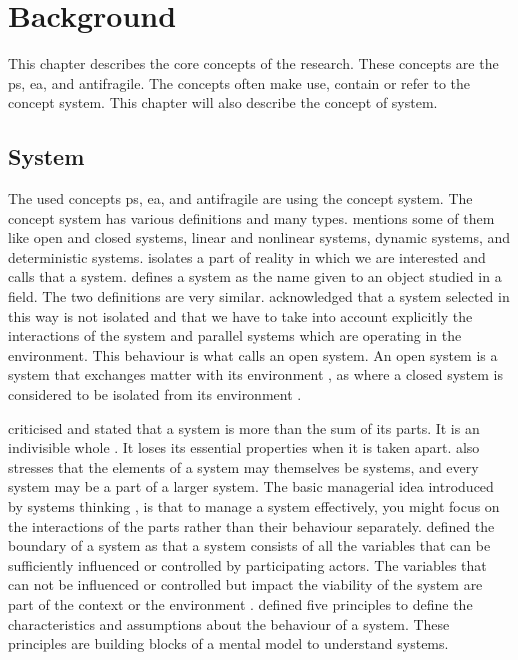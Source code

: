 \chapter{Background}
\label{ch:theoreticalbackground}
This chapter describes the core concepts of the research. These concepts are the \gls{ps}, \acrlong{ea}, and \gls{antifragile}. The concepts often make use, contain or refer to the concept system. This chapter will also describe the concept of system.

\section{System}
\label{sec:tbsystem}
The used concepts \gls{ps}, \acrshort{ea}, and \gls{antifragile} are using the concept system. The concept system has various definitions and many types. \textcite{Rickles2007} mentions some of them like open and closed systems, linear and nonlinear systems, dynamic systems, and deterministic systems. \textcite[p.~13]{Mannaert2016} isolates a part of reality in which we are interested and calls that a system. \textcite[p.~933]{Rickles2007} defines a system as the name given to an object studied in a field. The two definitions are very similar. \textcite[p.~13--14]{Mannaert2016} acknowledged that a system selected in this way is not isolated and that we have to take into account explicitly the interactions of the system and parallel systems which are operating in the environment. This behaviour is what \textcite[p.~32]{Bertalanffy1968} calls an open system. An open system is a system that exchanges matter with its environment \parencite[p.~32]{Bertalanffy1968}, as where a closed system is considered to be isolated from its environment \parencite[p.~39]{Bertalanffy1968}.

\textcite[p.~51--69]{Ackoff1964} criticised \textcite{Bertalanffy1951} and stated that a system is more than the sum of its parts. It is an indivisible whole \parencite[p.~664]{Ackoff1973}. It loses its essential properties when it is taken apart. \textcite[p.~664]{Ackoff1973} also stresses that the elements of a system may themselves be systems, and every system may be a part of a larger system. The basic managerial idea introduced by systems thinking \parencite{Ackoff1964}, is that to manage a system effectively, you might focus on the interactions of the parts rather than their behaviour separately. \textcite[p.~182]{Gharajedaghi2011} defined the boundary of a system as that a system consists of all the variables that can be sufficiently influenced or controlled by participating actors. The variables that can not be influenced or controlled but impact the viability of the system are part of the context \parencite[p.~183]{Gharajedaghi2011} or the environment \parencite[p.~13--14]{Mannaert2016}. \textcite[p.~29]{Gharajedaghi2011} defined five principles to define the characteristics and assumptions about the behaviour of a system. These principles are building blocks of a mental model to understand systems.

